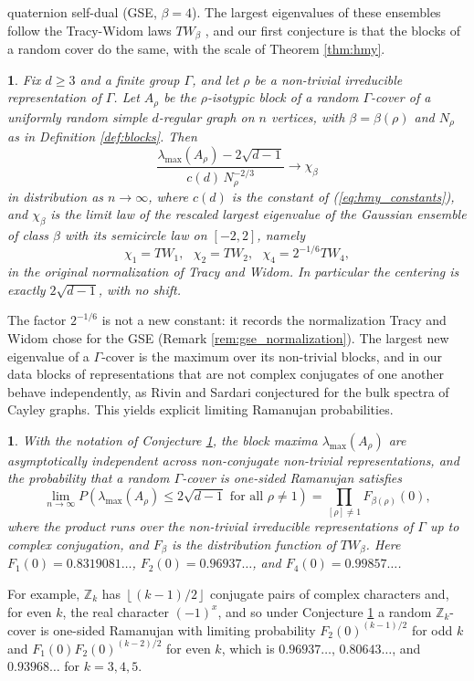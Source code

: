 \documentclass[12pt,oneside,english]{amsart}
\numberwithin{equation}{section}
\numberwithin{figure}{section}
\numberwithin{table}{section}
\theoremstyle{plain}
\numberwithin{thm}{section}
\theoremstyle{plain}
\theoremstyle{plain}
\theoremstyle{plain}
\newtheorem{conjecture}[thm]{\protect\conjecturename}
\theoremstyle{definition}
\theoremstyle{definition}
\theoremstyle{definition}
\theoremstyle{remark}
\providecommand{\conjecturename}{Conjecture}
\begin{document}
quaternion self-dual (GSE, $\beta=4$). The largest eigenvalues of
these ensembles follow the Tracy-Widom laws $TW_{\beta}$ \cite{TracyWidom1994,TracyWidom1996},
and our first conjecture is that the blocks of a random cover do the
same, with the scale of Theorem \ref{thm:hmy}.
\begin{conjecture}
\label{conj:symmetry_classes}Fix $d\geq3$ and a finite group $\Gamma$,
and let $\rho$ be a non-trivial irreducible representation of $\Gamma$.
Let $A_{\rho}$ be the $\rho$-isotypic block of a random $\Gamma$-cover
of a uniformly random simple $d$-regular graph on $n$ vertices, with
$\beta=\beta(\rho)$ and $N_{\rho}$ as in Definition \ref{def:blocks}.
Then
\[
\frac{\lambda_{\max}(A_{\rho})-2\sqrt{d-1}}{c(d)\,N_{\rho}^{-2/3}}\rightarrow\chi_{\beta}
\]
in distribution as $n\rightarrow\infty$, where $c(d)$ is the constant
of (\ref{eq:hmy_constants}), and $\chi_{\beta}$ is the limit law
of the rescaled largest eigenvalue of the Gaussian ensemble of class
$\beta$ with its semicircle law on $[-2,2]$, namely
\[
\chi_{1}=TW_{1},\ \ \ \chi_{2}=TW_{2},\ \ \ \chi_{4}=2^{-1/6}TW_{4},
\]
in the original normalization of Tracy and Widom. In particular the
centering is exactly $2\sqrt{d-1}$, with no shift.
\end{conjecture}
The factor $2^{-1/6}$ is not a new constant: it records the normalization
Tracy and Widom chose for the GSE (Remark \ref{rem:gse_normalization}).
The largest new eigenvalue of a $\Gamma$-cover is the maximum over
its non-trivial blocks, and in our data blocks of representations
that are not complex conjugates of one another behave independently,
as Rivin and Sardari \cite{RivinSardari2019} conjectured for the
bulk spectra of Cayley graphs. This yields explicit limiting Ramanujan
probabilities.
\begin{conjecture}
\label{conj:ramanujan_probabilities}With the notation of Conjecture
\ref{conj:symmetry_classes}, the block maxima $\lambda_{\max}(A_{\rho})$
are asymptotically independent across non-conjugate non-trivial representations,
and the probability that a random $\Gamma$-cover is one-sided Ramanujan
satisfies
\[
\lim_{n\rightarrow\infty}P\left(\lambda_{\max}(A_{\rho})\leq2\sqrt{d-1}\text{ for all }\rho\neq1\right)=\prod_{[\rho]\neq1}F_{\beta(\rho)}(0),
\]
where the product runs over the non-trivial irreducible representations
of $\Gamma$ up to complex conjugation, and $F_{\beta}$ is the distribution
function of $TW_{\beta}$. Here $F_{1}(0)=0.8319081\dots$, $F_{2}(0)=0.96937\dots$,
and $F_{4}(0)=0.99857\dots$.
\end{conjecture}
For example, $\mathbb{Z}_{k}$ has $\left\lfloor (k-1)/2\right\rfloor $
conjugate pairs of complex characters and, for even $k$, the real
character $(-1)^{x}$, and so under Conjecture \ref{conj:ramanujan_probabilities}
a random $\mathbb{Z}_{k}$-cover is one-sided Ramanujan with limiting
probability $F_{2}(0)^{(k-1)/2}$ for odd $k$ and $F_{1}(0)F_{2}(0)^{(k-2)/2}$
for even $k$, which is $0.96937\dots$, $0.80643\dots$, and $0.93968\dots$
for $k=3,4,5$.
\end{document}
